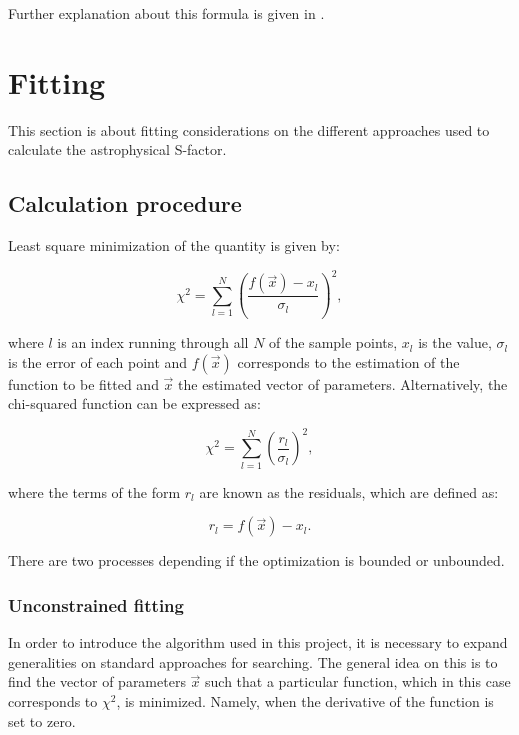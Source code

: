 \documentclass[openany]{book}
\begin{document}
Further explanation about this formula is given in \cite{heyde_2004}.

\chapter{Fitting} \label{ap:fitting}

This section is about fitting considerations on the different approaches used to calculate the astrophysical S-factor.

\section{Calculation procedure} \label{sec:calculationFitting}

Least square minimization of the quantity is given by:

\begin{equation} \label{eq:fitting_chiSquared}
	\chi^2  = \sum_{l=1}^{N} {\left(\frac{f(\vec x) - x_l}{\sigma_l}\right)^2},
\end{equation}

where $l$ is an index running through all $N$ of the sample points, $x_l$ is the value, $\sigma_l$ is the error of each point and $f(\vec x)$ corresponds to the estimation of the function to be fitted and $\vec x$ the estimated vector of parameters. Alternatively, the chi-squared function can be expressed as: 

\begin{equation} \label{eq:fitting_chiSquared_residuals}
	\chi^2  = \sum_{l=1}^{N} {\left(\frac{r_l}{\sigma_l}\right)^2},
\end{equation}

where the terms of the form $r_l$ are known as the residuals, which are defined as:

\begin{equation} \label{eq:fitting_residuals}
	r_l = f(\vec x) - x_l.
\end{equation}

There are two processes depending if the optimization is bounded or unbounded.

\subsection{Unconstrained fitting} \label{sub:unconstrainedFitting}

In order to introduce the algorithm used in this project, it is necessary to expand generalities on standard approaches for searching. The general idea on this is to find the vector of parameters $\vec x$ such that a particular function, which in this case corresponds to $\chi^2$, is minimized. Namely, when the derivative of the function is set to zero. \\
\end{document}
